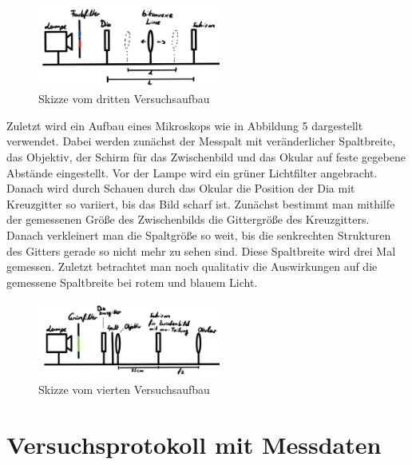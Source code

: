 \documentclass{article}
\begin{document}
\begin{figure} [h!]
    \centering
    \includegraphics[width=6cm]{graphics/3.jpg}
    \caption{Skizze vom dritten Versuchsaufbau}
\end{figure}

Zuletzt wird ein Aufbau eines Mikroskops wie in Abbildung 5 dargestellt verwendet. Dabei werden zunächst der Messpalt mit veränderlicher Spaltbreite, das Objektiv, der Schirm für das Zwischenbild und das Okular auf feste gegebene Abstände eingestellt. Vor der Lampe wird ein grüner Lichtfilter angebracht. Danach wird durch Schauen durch das Okular die Position der Dia mit Kreuzgitter so variiert, bis das Bild scharf ist. Zunächst bestimmt man mithilfe der gemessenen Größe des Zwischenbilds die Gittergröße des Kreuzgitters. Danach verkleinert man die Spaltgröße so weit, bis die senkrechten Strukturen des Gitters gerade so nicht mehr zu sehen sind. Diese Spaltbreite wird drei Mal gemessen. Zuletzt betrachtet man noch qualitativ die Auswirkungen auf die gemessene Spaltbreite bei rotem und blauem Licht.

\begin{figure} [h!]
    \centering
    \includegraphics[width=6cm]{graphics/4.jpg}
    \caption{Skizze vom vierten Versuchsaufbau}
\end{figure}

\newpage

\section{Versuchsprotokoll mit Messdaten}
\end{document}
